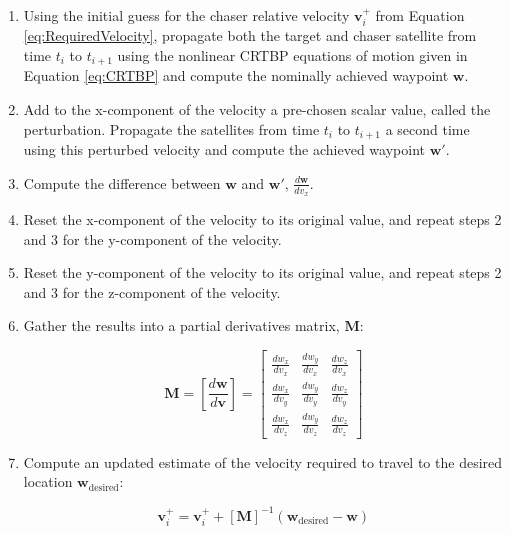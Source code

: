\documentclass[a4paper]{article}
\begin{document}
\begin{enumerate}[leftmargin=!,labelindent=12pt,itemindent=0pt, label=Step \arabic*:]

	\item Using the initial guess for the chaser relative velocity \(\mathbf{v}_i^+\) from Equation \ref{eq:RequiredVelocity}, propagate both the target and chaser satellite from time \(t_i\) to \(t_{i+1}\) using the nonlinear CRTBP equations of motion given in Equation \ref{eq:CRTBP} and compute the nominally achieved waypoint \(\mathbf{w}\).
	
	\item Add to the x-component of the velocity a pre-chosen scalar value, called the perturbation.  Propagate the satellites from time \(t_i\) to \(t_{i+1}\) a second time using this perturbed velocity and compute the achieved waypoint \(\mathbf{w}'\).
	
	\item Compute the difference between \(\mathbf{w}\) and \(\mathbf{w}'\), \(\frac{d\mathbf{w}}{dv_x}\).
	
	\item Reset the x-component of the velocity to its original value, and repeat steps 2 and 3 for the y-component of the velocity.
	
	\item Reset the y-component of the velocity to its original value, and repeat steps 2 and 3 for the z-component of the velocity.
	
	\item Gather the results into a partial derivatives matrix, \(\mathbf{M}\):
	
	\begin{equation} \label{eq:ShootingMethodPartialDerivs}
	\mathbf{M} = \left[ \frac{d\mathbf{w}}{d\mathbf{v}} \right]
	= \begin{bmatrix}
	\frac{dw_x}{dv_x} & \frac{dw_y}{dv_x} & \frac{dw_z}{dv_x} \\[0.3em]
	\frac{dw_x}{dv_y} & \frac{dw_y}{dv_y} & \frac{dw_z}{dv_y} \\[0.3em]
	\frac{dw_x}{dv_z} & \frac{dw_y}{dv_z} & \frac{dw_z}{dv_z}
	\end{bmatrix}
	\end{equation}
	
	\item Compute an updated estimate of the velocity required to travel to the desired location \(\mathbf{w}_{\mathrm{desired}}\):
	
	\begin{equation} \label{eq:ShootingMethodUpdate}
	\mathbf{v}_i^+ = \mathbf{v}_i^+ + [\mathbf{M}]^{-1}(\mathbf{w}_{\mathrm{desired}} - \mathbf{w})
	\end{equation}
	
\end{enumerate}
\end{document}
